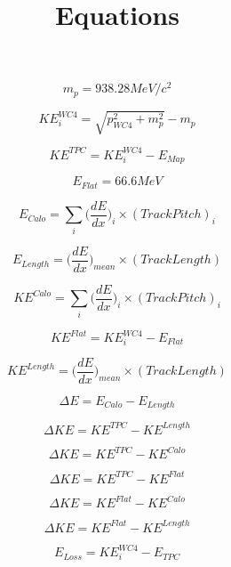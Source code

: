 \documentclass[11pt]{article}
\title{Equations}
\begin{document}
\begin{equation}
m_{p} = 938.28 MeV/c^{2}
\end{equation}

\begin{equation}
KE_{i}^{WC4} = \sqrt{p_{WC4}^{2} + m_{p}^{2}} - m_{p}
\end{equation}

\begin{equation}
KE^{TPC} = KE_{i}^{WC4} - E_{Map}
\end{equation}

\begin{equation}
E_{Flat} = 66.6 MeV
\end{equation}

\begin{equation}
E_{Calo} = \sum_{i} \Big(\frac{dE}{dx}\Big)_{i} \times (Track Pitch)_{i}
\end{equation}

\begin{equation}
E_{Length} = \Big(\frac{dE}{dx}\Big)_{mean} \times (Track Length)
\end{equation}

\begin{equation}
KE^{Calo} = \sum_{i} \Big(\frac{dE}{dx}\Big)_{i} \times (Track Pitch)_{i}
\end{equation}

\begin{equation}
KE^{Flat} = KE^{WC4}_{i} - E_{Flat}
\end{equation}

\begin{equation}
KE^{Length} = \Big(\frac{dE}{dx}\Big)_{mean} \times (Track Length)
\end{equation}

\begin{equation}
\Delta{E} = E_{Calo} - E_{Length}
\end{equation}

\begin{equation}
\Delta{KE} = KE^{TPC} - KE^{Length}
\end{equation}

\begin{equation}
\Delta{KE} = KE^{TPC} - KE^{Calo}
\end{equation}

\begin{equation}
\Delta{KE} = KE^{TPC} - KE^{Flat}
\end{equation}

\begin{equation}
\Delta{KE} = KE^{Flat} - KE^{Calo}
\end{equation}

\begin{equation}
\Delta{KE} = KE^{Flat} - KE^{Length}
\end{equation}

\begin{equation}
E_{Loss} = KE^{WC4}_{i} - E_{TPC}
\end{equation}
\end{document}
